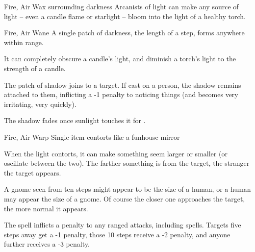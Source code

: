   {Fire, Air}%
  {Wax}%
  {}%
  {surrounding darkness}%
  {Arcanists of light can make any source of light -- even a candle flame or starlight -- bloom into the light of a healthy torch.}%
  {}

  {Fire, Air}%
  {Wane}%
  {}%
  {}%
  {A single patch of darkness, the length of a step, forms anywhere within range.}%
  {It can completely obscure a candle's light, and diminish a torch's light to the strength of a candle.

    The patch of shadow joins to a target.
    If cast on a person, the shadow remains attached to them, inflicting a -1 penalty to noticing things (and becomes very irritating, very quickly).

    The shadow fades once sunlight touches it for .}

  {Fire, Air}%
  {Warp}%
  {}%
  {}%
  {Single item contorts like a funhouse mirror}%
  {When the light contorts, it can make something seem larger or smaller (or oscillate between the two).
    The farther something is from the target, the stranger the target appears.

    A gnome seen from ten steps might appear to be the size of a human, or a human may appear the size of a gnome.
    Of course the closer one approaches the target, the more normal it appears.

    The spell inflicts a penalty to any ranged attacks, including spells.
    Targets five steps away get a -1 penalty, those 10 steps receive a -2 penalty, and anyone further receives a -3 penalty.}

